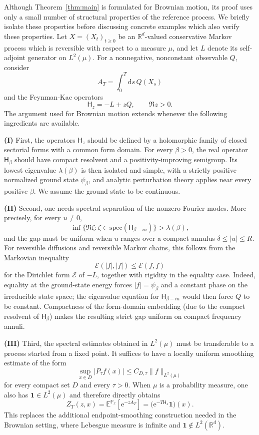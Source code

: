 \documentclass[11pt,reqno]{amsart}
\theoremstyle{definition}
\numberwithin{equation}{section}
\newcommand{\<}{\langle}
\renewcommand{\>}{\rangle}
\def\spec{{\rm spec}}
\def\R{{\mathbb R}}
\def\de{{\rm d}}
\def\spec{{\mathrm {spec}}}
\def\de{{\mathrm {d}}}
\def\bbP{{\mathbb{P}}}
\begin{document}
Although Theorem~\ref{thm:main} is formulated for Brownian motion, its
proof uses only a small number of structural properties of the reference
process.  We briefly isolate these properties before discussing concrete
examples which also verify these properties.
Let $X=(X_t)_{t\geq 0}$ be an $\R^d$-valued conservative Markov process which is reversible
with respect to a measure $\mu$, and let $L$ denote its self-adjoint
generator on $L^2(\mu)$.  For a nonnegative, nonconstant observable $Q$,
consider
\[
    A_T=\int_0^T \de s \, Q(X_s)
\]
and the Feynman-Kac operators
\[
    \mathsf H_z=-L+zQ,
    \qquad \Re z>0.
\]
The argument used for Brownian motion extends whenever the following
ingredients are available.

\textbf{(I)} First, the operators $\mathsf H_z$ should be defined by a holomorphic family
of closed sectorial forms with a common form domain.  For every $\beta>0$,
the real operator $\mathsf H_\beta$ should have compact resolvent and a
positivity-improving semigroup.  Its lowest eigenvalue
$\lambda(\beta)$ is then isolated and simple, with a strictly positive
normalized ground state $\psi_\beta$, and analytic perturbation theory
applies near every positive $\beta$. We assume the ground state to be continuous.

\textbf{(II)} Second, one needs spectral separation of the nonzero Fourier modes.  More
precisely, for every $u\neq0$,
\[
    \inf\bigl\{\Re\zeta:
        \zeta\in\spec(\mathsf H_{\beta-iu})\bigr\}
       >\lambda(\beta),
\]
and the gap must be uniform when $u$ ranges over a compact annulus
$\delta\leq |u|\leq R$.  For reversible diffusions and reversible Markov
chains, this follows from the Markovian inequality
\[
    \mathcal E(|f|,|f|)\leq \mathcal E(f,f)
\]
for the Dirichlet form $\mathcal E$ of $-L$, together with rigidity in the
equality case.  Indeed, equality at the ground-state energy forces
$|f|=\psi_\beta$ and a constant phase on the irreducible state space; the
eigenvalue equation for $\mathsf H_{\beta-iu}$ would then force $Q$ to be
constant.  Compactness of the form-domain embedding (due to the compact resolvent of $\mathsf H_\beta$) makes the resulting
strict gap uniform on compact frequency annuli.

\textbf{(III)} Third, the spectral estimates obtained in $L^2(\mu)$ must be transferable
to a process started from a fixed point.  It suffices to have a locally
uniform smoothing estimate of the form
\[
    \sup_{x\in D}|P_\tau f(x)|
       \leq C_{D,\tau}\|f\|_{L^2(\mu)}
\]
for every compact set $D$ and every $\tau>0$.  When $\mu$ is a probability
measure, one also has $\mathbf 1\in L^2(\mu)$ and therefore directly obtains
\[
    Z_T(z,x)
      =\mathbb E^{\bbP_x}\!\left[\mathrm e^{-zA_T}\right]
      =\bigl(\mathrm e^{-T\mathsf H_z}\mathbf 1\bigr)(x).
\]
This replaces the additional endpoint-smoothing construction needed in the
Brownian setting, where Lebesgue measure is infinite and
$\mathbf 1\notin L^2(\mathbb R^d)$.
\end{document}

